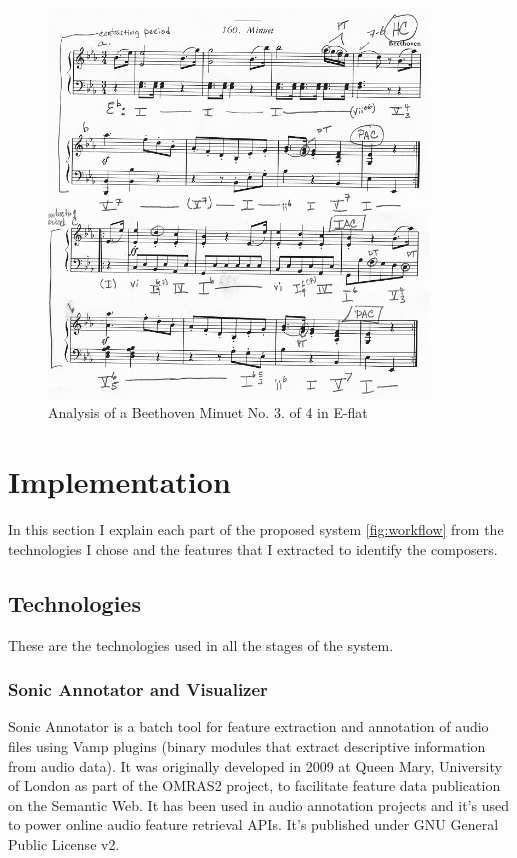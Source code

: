 \documentclass[a4paper,openany,oneside,12pt]{book}
\begin{document}
\begin{figure}
\centering
\includegraphics[width=0.9\textwidth]{img/musical_analysis.jpg} 
\caption{Analysis of a Beethoven Minuet No. 3. of 4 in E-flat} \label{fig:music_analysis}
\end{figure}

\newpage
\thispagestyle{empty}
\mbox{}



\chapter{Implementation}\label{implementation}
In this section I explain each part of the proposed system \ref{fig:workflow} from the technologies I chose and the features that I extracted to identify the composers.

\section{Technologies}\label{techs}
These are the technologies used in all the stages of the system.

\subsection{Sonic Annotator and Visualizer}
Sonic Annotator\cite{chris2010a} is a batch tool for feature extraction and annotation of audio files using Vamp plugins (binary modules that extract descriptive information from audio data). It was originally developed in 2009 at Queen Mary, University of London as part of the OMRAS2 project, to facilitate feature data publication on the Semantic Web. It has been used in audio annotation projects and it's used to power online audio feature retrieval APIs. It's published under GNU General Public License v2.
\end{document}
